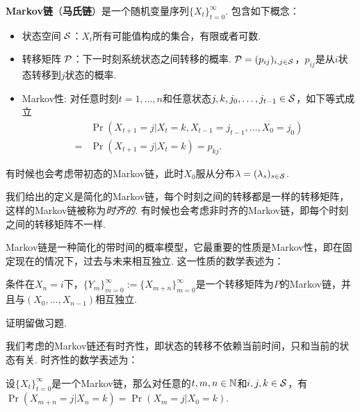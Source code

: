 \begin{definition}[Markov链]
\textbf{Markov链}（\textbf{马氏链}）是一个随机变量序列$\{X_t\}_{t=0}^{\infty}$. 包含如下概念：
\begin{itemize}
	\item 状态空间 $\MS$：$X_t$所有可能值构成的集合，有限或者可数.
	\item 转移矩阵 $\P$：下一时刻系统状态之间转移的概率. $\P=(p_{ij})_{i,j\in \MS}$，$p_{ij}$是从$i$状态转移到$j$状态的概率.
	\item Markov性: 对任意时刻$t=1,\dots,n$和任意状态$j,k,j_0,\dots,j_{t-1}\in \MS$，如下等式成立
		\begin{align*}
		   &\Pr(X_{t+1}=j| X_t=k,X_{t-1}=j_{t-1},\dots,X_0=j_0)\\
		   =& \Pr(X_{t+1}=j| X_{t}=k)=p_{kj}.
		\end{align*}
    \end{itemize}
    有时候也会考虑带初态的Markov链，此时$X_0$服从分布$\lambda=(\lambda_s)_{s\in \MS}$.
\end{definition}
我们给出的定义是简化的Markov链，每个时刻之间的转移都是一样的转移矩阵，这样的Markov链被称为\emph{时齐的}. 有时候也会考虑非时齐的Markov链，即每个时刻之间的转移矩阵不一样.

Markov链是一种简化的带时间的概率模型，它最重要的性质是Markov性，即在固定现在的情况下，过去与未来相互独立. 这一性质的数学表述为：
\begin{proposition}[Markov性]\label{prop:markov}
条件在$X_n=i$下，$\{Y_m\}_{m=0}^{\infty}:=\{X_{m+n}\}_{m=0}^{\infty}$是一个转移矩阵为$P$的Markov链，并且与$(X_0,\dots,X_{n-1})$相互独立. %
\end{proposition}
证明留做习题. 

我们考虑的Markov链还有时齐性，即状态的转移不依赖当前时间，只和当前的状态有关. 时齐性的数学表述为：
\begin{proposition}
    设$\{X_t\}_{t=0}^{\infty}$是一个Markov链，那么对任意的$t,m,n\in \N$和$i,j,k\in \MS$，有
    $\Pr(X_{m+n}=j| X_{n}=k)=\Pr(X_{m}=j| X_{0}=k)$.
\end{proposition}

